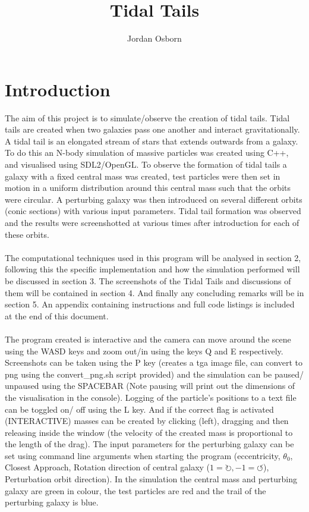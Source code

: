 \documentclass[10pt,a4paper]{article}
\begin{document}
\begin{titlingpage}
\title{Tidal Tails}
\author{Jordan Osborn}
\maketitle
\begin{abstract}
	
\end{abstract}
	
	
\end{titlingpage}

\clearpage
\section{Introduction}
The aim of this project is to simulate/observe the creation of tidal tails. Tidal tails are created when two galaxies pass one another and interact gravitationally. A tidal tail is an elongated stream of stars that extends outwards from a galaxy.  To do this an N-body simulation of massive particles was created using C++, and visualised using SDL2/OpenGL. To observe the formation of tidal tails a galaxy with a fixed central mass was created, test particles were then set in motion in a uniform distribution around this central mass such that the orbits were circular. A perturbing galaxy was then introduced on several different orbits (conic sections) with various input parameters. Tidal tail formation was observed and the results were screenshotted at various times after introduction for each of these orbits. 
\\
\\
The computational techniques used in this program will be analysed in section 2, following this the specific implementation and how the simulation performed will be discussed in section 3. The screenshots of the Tidal Tails and discussions of them will be contained in section 4. And finally any concluding remarks will be in section 5. An appendix containing instructions and full code listings is included at the end of this document. 
\\
\\
The program created is interactive and the camera can move around the scene using the WASD keys and zoom out/in using the keys Q and E respectively. Screenshots can be taken using the P key (creates a tga image file, can convert to png using the convert\_png.sh script provided) and the simulation can be paused/ unpaused using the SPACEBAR (Note pausing will print out the dimensions of the visualisation in the console). Logging of the particle's positions to a text file can be toggled on/ off using the L key. And if the correct flag is activated (INTERACTIVE) masses can be created by clicking (left), dragging and then releasing inside the window (the velocity of the created mass is proportional to the length of the drag). The input parameters for the perturbing galaxy can be set using command line arguments when starting the program (eccentricity, $\theta_0$, Closest Approach, Rotation direction of central galaxy ($1=\circlearrowright, -1=\circlearrowleft$), Perturbation orbit direction). In the simulation the central mass and perturbing galaxy are green in colour, the test particles are red and the trail of the perturbing galaxy is blue.
\end{document}
